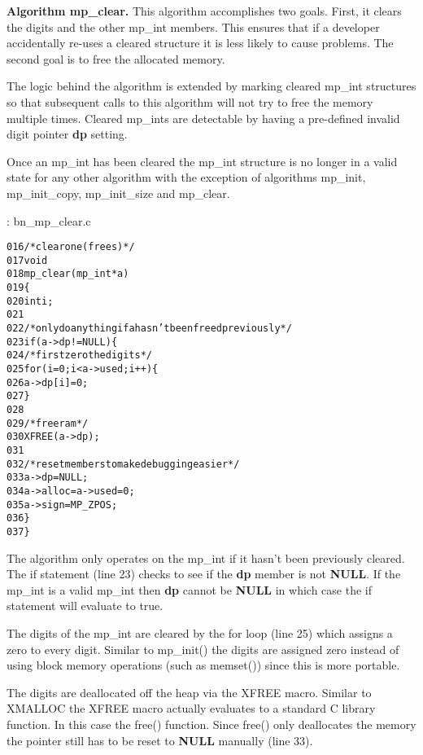 \documentclass[b5paper]{book}
\begin{document}
\textbf{Algorithm mp\_clear.}
This algorithm accomplishes two goals.  First, it clears the digits and the other mp\_int members.  This ensures that 
if a developer accidentally re-uses a cleared structure it is less likely to cause problems.  The second goal
is to free the allocated memory.

The logic behind the algorithm is extended by marking cleared mp\_int structures so that subsequent calls to this
algorithm will not try to free the memory multiple times.  Cleared mp\_ints are detectable by having a pre-defined invalid 
digit pointer \textbf{dp} setting.

Once an mp\_int has been cleared the mp\_int structure is no longer in a valid state for any other algorithm
with the exception of algorithms mp\_init, mp\_init\_copy, mp\_init\_size and mp\_clear.

\vspace{+3mm}\begin{small}
\hspace{-5.1mm}{\bf File}: bn\_mp\_clear.c
\vspace{-3mm}
\begin{alltt}
016   /* clear one (frees)  */
017   void
018   mp_clear (mp_int * a)
019   \{
020     int i;
021   
022     /* only do anything if a hasn't been freed previously */
023     if (a->dp != NULL) \{
024       /* first zero the digits */
025       for (i = 0; i < a->used; i++) \{
026           a->dp[i] = 0;
027       \}
028   
029       /* free ram */
030       XFREE(a->dp);
031   
032       /* reset members to make debugging easier */
033       a->dp    = NULL;
034       a->alloc = a->used = 0;
035       a->sign  = MP_ZPOS;
036     \}
037   \}
\end{alltt}
\end{small}

The algorithm only operates on the mp\_int if it hasn't been previously cleared.  The if statement (line 23)
checks to see if the \textbf{dp} member is not \textbf{NULL}.  If the mp\_int is a valid mp\_int then \textbf{dp} cannot be
\textbf{NULL} in which case the if statement will evaluate to true.

The digits of the mp\_int are cleared by the for loop (line 25) which assigns a zero to every digit.  Similar to mp\_init()
the digits are assigned zero instead of using block memory operations (such as memset()) since this is more portable.  

The digits are deallocated off the heap via the XFREE macro.  Similar to XMALLOC the XFREE macro actually evaluates to
a standard C library function.  In this case the free() function.  Since free() only deallocates the memory the pointer
still has to be reset to \textbf{NULL} manually (line 33).  
\end{document}
